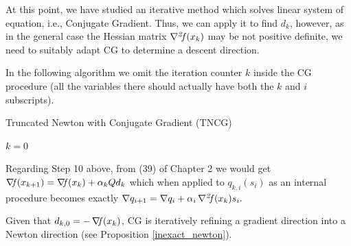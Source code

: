 \documentclass[10pt,a4paper]{article}
\begin{document}
At this point, we have studied an iterative method which solves linear system of equation, i.e., Conjugate Gradient. Thus, we can apply it to find $d_k$, however, as in the general case the Hessian matrix $\operatorname*{\mathit{\nabla^2 \!f}}(x_k)$ may be not positive definite, we need to suitably adapt CG to determine a descent direction.

In the following algorithm we omit the iteration counter $k$ inside the CG procedure (all the variables there should actually have both the $k$ and $i$ subscripts).\\
\begin{algorithm}[H]\label{alg:tncg}
\caption{Truncated Newton with Conjugate Gradient (TNCG)}


$k=0$

\end{algorithm}
\noindent Regarding Step 10 above, from (39) of Chapter 2 we would get 
$\operatorname*{\mathit{\nabla \!f}}(x_{k+1}) = \operatorname*{\mathit{\nabla \!f}}(x_k) +\alpha_k Q d_k$ which when applied to $q_{k,i}(s_i)$ as an internal procedure becomes exactly $\nabla q_{i+1} = \nabla q_i + \alpha_i \operatorname*{\mathit{\nabla^2 \!f}}(x_k) s_i.$
\par Given that $d_{k,0}=-\operatorname*{\mathit{\nabla \!f}}(x_k)$, CG is iteratively refining a gradient direction into a Newton direction (see Proposition \ref{inexact_newton}).
\end{document}

